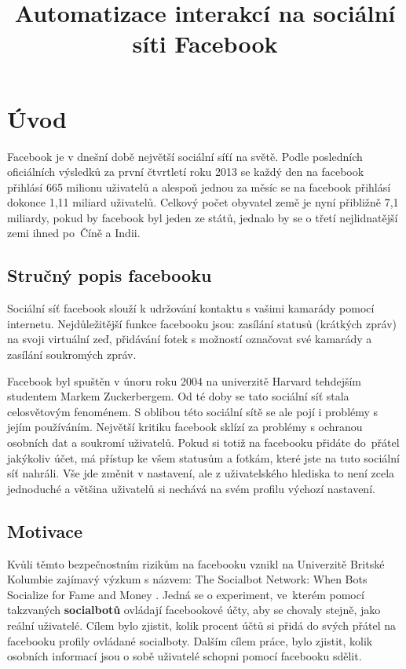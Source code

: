 \documentclass[thesis=M,czech]{FITthesis}[2013/05/10]
\title{Automatizace interakcí na sociální síti Facebook}
\begin{document}


\chapter{{\' U}vod}

Facebook je v dnešní době největší sociální síťí na světě. Podle posledních oficiálních výsledků \cite{web:fbMonthlyActiveUsers} za první čtvrtletí roku 2013 se každý den na facebook přihlásí 665 milionu uživatelů a alespoň jednou za měsíc se na facebook přihlásí dokonce 1,11 miliard uživatelů. Celkový počet obyvatel země je nyní přibližně 7,1 miliardy, pokud by facebook byl jeden ze států, jednalo by se o třetí nejlidnatější zemi ihned po~Číně a Indii.

\section{Stručný popis facebooku}

Sociální síť facebook slouží k udržování kontaktu s vašimi kamarády pomocí internetu. Nejdůležitější funkce facebooku jsou: zasílání statusů (krátkých zpráv) na svoji virtuální zeď, přidávání fotek s možností označovat své kamarády a zasílání soukromých zpráv.

Facebook byl spuštěn v únoru roku 2004 na univerzitě Harvard tehdejším studentem Markem Zuckerbergem. Od té doby se tato sociální síť stala celosvětovým fenoménem. S oblibou této sociální sítě se ale pojí i problémy s jejím používáním. Největší kritiku facebook sklízí za problémy s ochranou osobních dat a soukromí uživatelů. Pokud si totiž na facebooku přidáte do~přátel jakýkoliv účet, má přístup ke všem statusům a fotkám, které jste na tuto sociální síť nahráli. Vše jde změnit v nastavení, ale z uživatelského hlediska to není zcela jednoduché a většina uživatelů si nechává na svém profilu výchozí nastavení.

\section{Motivace}

Kvůli těmto bezpečnostním rizikům na facebooku vznikl na Univerzitě Britské Kolumbie zajímavý výzkum s názvem: The Socialbot Network:
When Bots Socialize for Fame and Money \cite{web:socialbotNetwork}. Jedná se o experiment, ve~kterém pomocí takzvaných \textbf{socialbotů} ovládají facebookové účty, aby se chovaly stejně, jako reální uživatelé. Cílem bylo zjistit, kolik procent účtů si přidá do svých přátel na facebooku profily ovládané socialboty. Dalším cílem práce, bylo zjistit, kolik osobních informací jsou o sobě uživatelé schopni pomocí facebooku sdělit.
\end{document}
